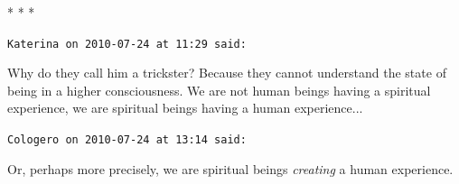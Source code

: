 
\begin{center}* * *\end{center}

\begin{footnotesize}
\begin{sffamily}
\texttt{Katerina on 2010-07-24 at 11:29 said:}

Why do they call him a trickster? Because they cannot understand the state of being in a higher consciousness. We are not human beings having a spiritual experience, we are spiritual beings having a human experience... 

\hfill

\texttt{Cologero on 2010-07-24 at 13:14 said:}

Or, perhaps more precisely, we are spiritual beings \emph{creating} a human experience.


\hfill

\end{sffamily}
\end{footnotesize}

